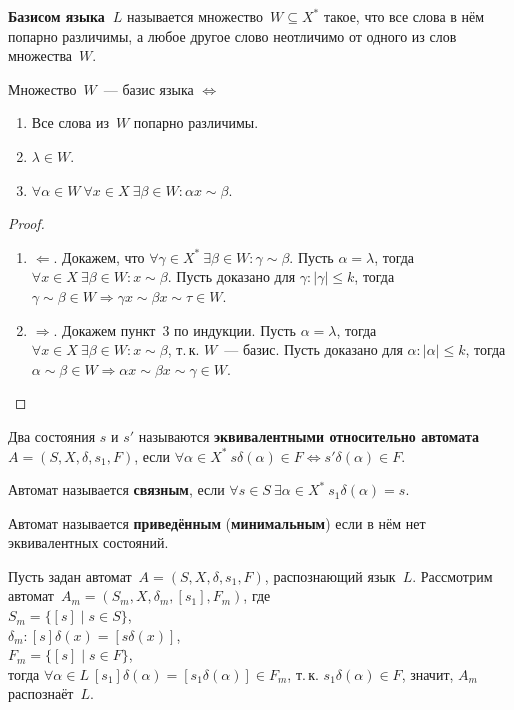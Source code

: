  \textbf{Базисом языка~$L$} называется множество~$W \subseteq X^*$ такое, что все слова в нём попарно различимы, а любое другое слово неотличимо от одного из слов множества~$W$.

\begin{theorem}
Множество~$W$~--- базис языка $\Leftrightarrow$
\begin{enumerate}
	\item Все слова из~$W$ попарно различимы.
	\item $\lambda \in W$.
	\item $\forall \alpha \in W \ \forall x \in X \ \exists \beta \in W \colon \alpha x \sim \beta$.
\end{enumerate}
\end{theorem}
\begin{proof}
\begin{enumerate}
	\item $\Leftarrow$. Докажем, что $\forall \gamma \in X^* \ \exists \beta \in W \colon \gamma \sim \beta$.
		\indbase Пусть $\alpha = \lambda$, тогда $\forall x \in X \ \exists \beta \in W \colon x \sim \beta$.
		\indstep Пусть доказано для $\gamma \colon |\gamma| \leqslant k$, тогда $\gamma \sim \beta \in W \Rightarrow \gamma x \sim \beta x \sim \tau \in W$.
		\indend
	\item $\Rightarrow$. Докажем пункт~3 по индукции.
		\indbase Пусть $\alpha = \lambda$, тогда $\forall x \in X \ \exists \beta \in W \colon x \sim \beta$, т.\,к. $W$~--- базис.
		\indstep Пусть доказано для $\alpha \colon |\alpha| \leqslant k$, тогда $\alpha \sim \beta \in W \Rightarrow \alpha x \sim \beta x \sim \gamma \in W$.
		\indend
\end{enumerate}
\end{proof}

Два состояния $s$ и $s'$ называются \textbf{эквивалентными относительно автомата~$A = (S, X, \delta, s_1, F)$}, если $\forall \alpha \in X^* \ \allowbreak s \delta(\alpha) \in F \Leftrightarrow s' \delta(\alpha) \in F$.

 Автомат называется \textbf{связным}, если $\forall s \in S \ \exists \alpha \in X^* \ s_1 \delta(\alpha) = s$.

  Автомат называется \textbf{приведённым} (\textbf{минимальным}) если в нём нет эквивалентных состояний.

Пусть задан автомат~$A = (S, X, \delta, s_1, F)$, распознающий язык~$L$.
Рассмотрим автомат~$A_m = (S_m, X, \delta_m, [s_1], F_m)$, где\\
$S_m = \{ [s] \mid s \in S \}$,\\
$\delta_m \colon [s] \delta(x) = [s \delta(x)]$,\\
$F_m = \{ [s] \mid s \in F \}$,\\
тогда $\forall \alpha \in L \ [s_1] \delta(\alpha) = [s_1 \delta(\alpha)] \in F_m$, т.\,к. $s_1 \delta(\alpha) \in F$, значит, $A_m$ распознаёт~$L$.

